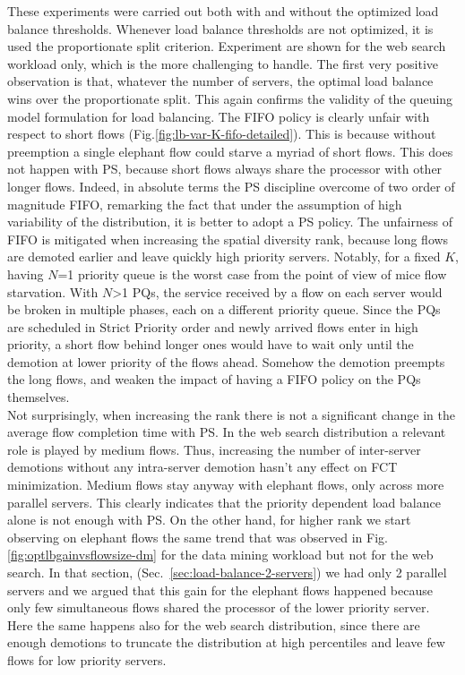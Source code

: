 These experiments were carried out both with and without the optimized load balance thresholds. Whenever load balance thresholds are not optimized, it is used the proportionate split criterion. Experiment are shown for the web search workload only, which is the more challenging to handle. The first very positive observation is that, whatever the number of servers, the optimal load balance wins over the proportionate split. This again confirms the validity of the queuing model formulation for load balancing. 
The FIFO policy is clearly unfair with respect to short flows (Fig.\ref{fig:lb-var-K-fifo-detailed}). This is because without preemption a single elephant flow could starve a myriad of short flows. This does not happen with PS, because short flows always share the processor with other longer flows. Indeed, in absolute terms the PS discipline overcome of two order of magnitude FIFO, remarking the fact that under the assumption of high variability of the distribution, it is better to adopt a PS policy. The unfairness of FIFO is mitigated when increasing the spatial diversity rank, because long flows are demoted earlier and leave quickly high priority servers. Notably, for a fixed $K$, having $N$=1 priority queue is the worst case from the point of view of mice flow starvation. With $N$>1 PQs, the service received by a flow on each server would be broken in multiple phases, each on a different priority queue. Since the PQs are scheduled in Strict Priority order and newly arrived flows enter in high priority, a short flow behind longer ones would have to wait only until the demotion at lower priority of the flows ahead. Somehow the demotion preempts the long flows, and weaken the impact of having a FIFO policy on the PQs themselves. \\
Not surprisingly, when increasing the rank there is not a significant change in the average flow completion time with PS. In the web search distribution a relevant role is played by medium flows. Thus, increasing the number of inter-server demotions without any intra-server demotion hasn't any effect on FCT minimization. Medium flows stay anyway with elephant flows, only across more parallel servers. This clearly indicates that the priority dependent load balance alone is not enough with PS. On the other hand, for higher rank we start observing on elephant flows the same trend that was observed in Fig.\ref{fig:optlbgainvsflowsize-dm} for the data mining workload but not for the web search. In that section, (Sec.~\ref{sec:load-balance-2-servers}) we had only 2 parallel servers and we argued that this gain for the elephant flows happened because only few simultaneous flows shared the processor of the lower priority server. Here the same happens also for the web search distribution, since there are enough demotions to truncate the distribution at high percentiles and leave few flows for low priority servers.

